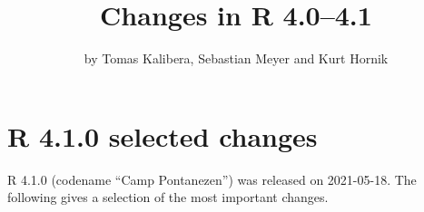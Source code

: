 \title{Changes in R 4.0--4.1}
\author{by Tomas Kalibera, Sebastian Meyer and Kurt Hornik}
\maketitle


\sloppy



\section{R 4.1.0 selected changes}

R 4.1.0 (codename ``Camp Pontanezen'') was released on 2021-05-18.  The
following gives a selection of the most important changes.

